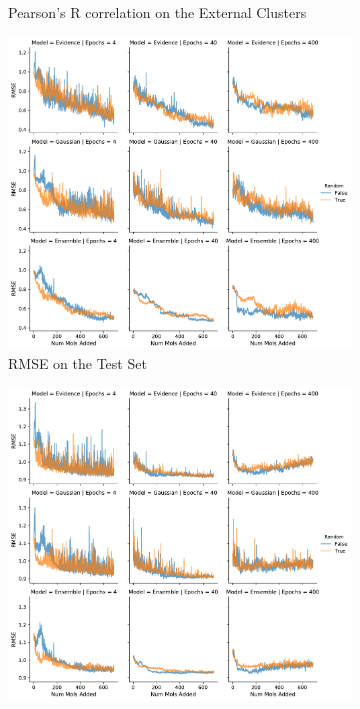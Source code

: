 \documentclass[journal=jmcmar,manuscript=article]{achemso}
\begin{document}
\begin{figure}[tbph]
\begin{subfigure}[b]{0.48\textwidth}
        \caption{Pearson's R correlation on the External Clusters}
    \end{subfigure}%
    \hfill
    \begin{subfigure}[b]{0.48\textwidth}
        \includegraphics[width=1\linewidth]{figures/fig8_morgan_fp_bigmodel_RMSE.pdf}
        \caption{RMSE on the Test Set}
    \end{subfigure}%
    \hfill
    \begin{subfigure}[b]{0.48\textwidth}
        \includegraphics[width=1\linewidth]{figures/fig8_morgan_fp_bigmodel_rest_RMSE.pdf}

\end{subfigure}
\end{figure}
\end{document}

